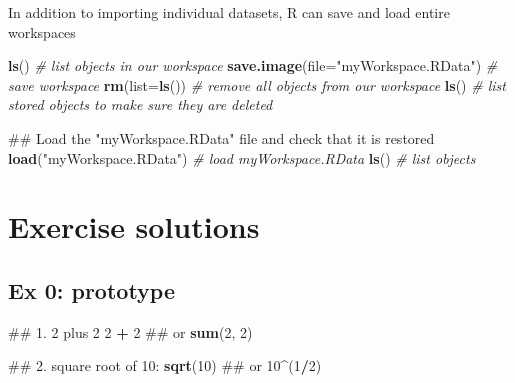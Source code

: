 \documentclass[]{book}
\newenvironment{Shaded}{\begin{snugshade}}{\end{snugshade}}
\newcommand{\KeywordTok}[1]{\textcolor[rgb]{0.13,0.29,0.53}{\textbf{#1}}}
\newcommand{\DataTypeTok}[1]{\textcolor[rgb]{0.13,0.29,0.53}{#1}}
\newcommand{\DecValTok}[1]{\textcolor[rgb]{0.00,0.00,0.81}{#1}}
\newcommand{\StringTok}[1]{\textcolor[rgb]{0.31,0.60,0.02}{#1}}
\newcommand{\CommentTok}[1]{\textcolor[rgb]{0.56,0.35,0.01}{\textit{#1}}}
\newcommand{\OperatorTok}[1]{\textcolor[rgb]{0.81,0.36,0.00}{\textbf{#1}}}
\newcommand{\NormalTok}[1]{#1}
\begin{document}
In addition to importing individual datasets, R can save and load entire
workspaces

\begin{Shaded}
\begin{Highlighting}[]
\KeywordTok{ls}\NormalTok{() }\CommentTok{# list objects in our workspace}
\KeywordTok{save.image}\NormalTok{(}\DataTypeTok{file=}\StringTok{"myWorkspace.RData"}\NormalTok{) }\CommentTok{# save workspace }
\KeywordTok{rm}\NormalTok{(}\DataTypeTok{list=}\KeywordTok{ls}\NormalTok{()) }\CommentTok{# remove all objects from our workspace }
\KeywordTok{ls}\NormalTok{() }\CommentTok{# list stored objects to make sure they are deleted}
\end{Highlighting}
\end{Shaded}

\begin{Shaded}
\begin{Highlighting}[]
\NormalTok{## Load the "myWorkspace.RData" file and check that it is restored}
\KeywordTok{load}\NormalTok{(}\StringTok{"myWorkspace.RData"}\NormalTok{) }\CommentTok{# load myWorkspace.RData}
\KeywordTok{ls}\NormalTok{() }\CommentTok{# list objects}
\end{Highlighting}
\end{Shaded}

\section{Exercise solutions}\label{exercise-solutions}

\subsection{Ex 0: prototype}\label{ex-0-prototype}

\begin{Shaded}
\begin{Highlighting}[]
\NormalTok{## 1. 2 plus 2}
\DecValTok{2} \OperatorTok{+}\StringTok{ }\DecValTok{2}
\NormalTok{## or}
\KeywordTok{sum}\NormalTok{(}\DecValTok{2}\NormalTok{, }\DecValTok{2}\NormalTok{)}
\end{Highlighting}
\end{Shaded}

\begin{Shaded}
\begin{Highlighting}[]
\NormalTok{## 2. square root of 10:}
\KeywordTok{sqrt}\NormalTok{(}\DecValTok{10}\NormalTok{)}
\NormalTok{## or}
\DecValTok{10}\OperatorTok{^}\NormalTok{(}\DecValTok{1}\OperatorTok{/}\DecValTok{2}\NormalTok{)}
\end{Highlighting}
\end{Shaded}
\end{document}
